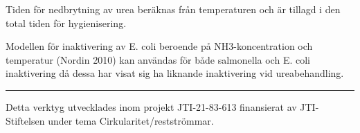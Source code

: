 \documentclass[
  a4paper,
  DIV=11,
  numbers=noendperiod]{scrartcl}
\newenvironment{Shaded}{\begin{snugshade}}{\end{snugshade}}
\begin{document}
\begin{figure}
\begin{minipage}{0.50\linewidth}
\begin{Shaded}
\begin{Highlighting}[]
\end{Highlighting}
\end{Shaded}

\end{minipage}%
\newline
\begin{minipage}{0.50\linewidth}

\end{minipage}%

\end{figure}%

Tiden
för
nedbrytning
av
urea
beräknas
från
temperaturen
och
är
tillagd
i
den
total
tiden
för
hygienisering.

Modellen
för
inaktivering
av
E.
coli
beroende
på
NH3-koncentration
och
temperatur
(Nordin
2010)
kan
användas
för
både
salmonella
och
E.
coli
inaktivering
då
dessa
har
visat
sig
ha
liknande
inaktivering
vid
ureabehandling.

\begin{center}\rule{0.5\linewidth}{0.5pt}\end{center}

Detta
verktyg
utvecklades
inom
projekt
JTI-21-83-613
finansierat
av
JTI-Stiftelsen
under
tema
Cirkularitet/restströmmar.
\end{document}
